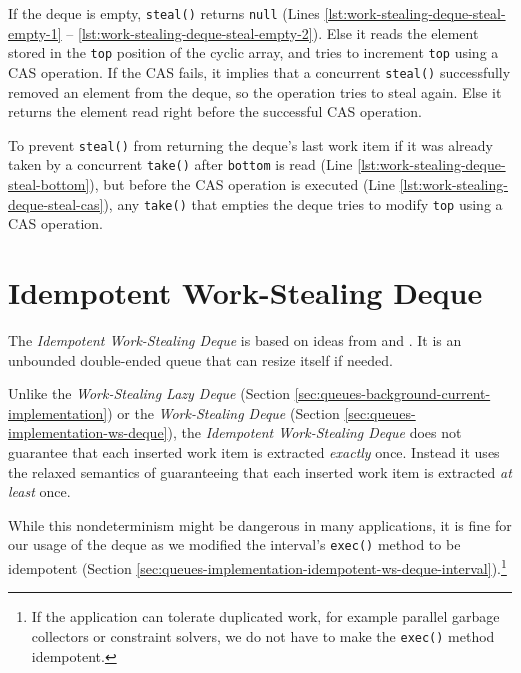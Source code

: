 If the deque is empty, \lstinline!steal()! returns \lstinline!null!
(Lines \ref{lst:work-stealing-deque-steal-empty-1} --
\ref{lst:work-stealing-deque-steal-empty-2}). Else it reads the
element stored in the \lstinline!top! position of the cyclic array,
and tries to increment \lstinline!top! using a CAS operation. If the
CAS fails, it implies that a concurrent \lstinline!steal()!
successfully removed an element from the deque, so the operation tries
to steal again. Else it returns the element read right before the
successful CAS operation.

To prevent \lstinline!steal()! from returning the deque's last work
item if it was already taken by a concurrent \lstinline!take()! after
\lstinline!bottom! is read (Line
\ref{lst:work-stealing-deque-steal-bottom}), but before the CAS
operation is executed (Line \ref{lst:work-stealing-deque-steal-cas}),
any \lstinline!take()! that empties the deque tries to modify
\lstinline!top! using a CAS operation.




\section{Idempotent Work-Stealing Deque}
\label{sec:queues-implementation-idempotent-ws-deque}

The \emph{Idempotent Work-Stealing Deque} is based on ideas from
\cite{Leijen2009} and \cite{Michael2009}. It is an unbounded
double-ended queue that can resize itself if needed.

Unlike the \emph{Work-Stealing Lazy Deque} (Section
\ref{sec:queues-background-current-implementation}) or the
\emph{Work-Stealing Deque} (Section
\ref{sec:queues-implementation-ws-deque}), the \emph{Idempotent
  Work-Stealing Deque} does not guarantee that each inserted work item
is extracted \emph{exactly} once. Instead it uses the relaxed
semantics of guaranteeing that each inserted work item is extracted
\emph{at least} once.

While this nondeterminism might be dangerous in many applications, it
is fine for our usage of the deque as we modified the interval's
\lstinline!exec()! method to be idempotent (Section
\ref{sec:queues-implementation-idempotent-ws-deque-interval}).\footnote{If
  the application can tolerate duplicated work, for example parallel
  garbage collectors \cite{Flood2001} or constraint solvers, we do not
  have to make the \verb!exec()! method idempotent.}


